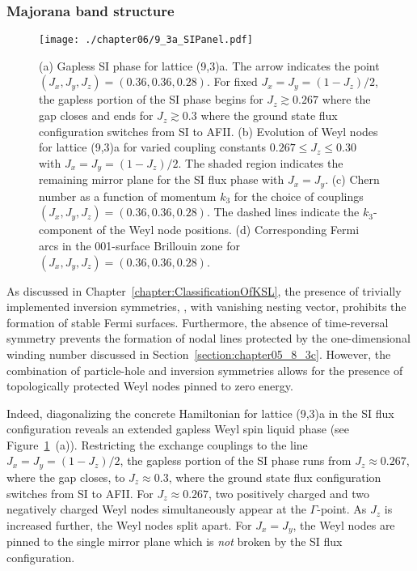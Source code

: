 \subsubsection{Majorana band structure}
%
%
%
\begin{figure}[tb]
	\centering
	\texttt{[image: ./chapter06/9\_3a\_SIPanel.pdf]}
	\caption{
		(a) Gapless SI phase for lattice (9,3)a.
		The arrow indicates the point $(J_x, J_y, J_z) = (0.36, 0.36, 0.28)$.
		For fixed $J_x = J_y = (1 - J_z)/2$, the gapless portion of the SI phase begins for $J_z \gtrsim 0.267$ where the gap closes and ends for $J_z \gtrsim 0.3$ where the ground state flux configuration switches from SI to AFII.
		(b) Evolution of Weyl nodes for lattice (9,3)a for varied coupling constants $0.267 \leq J_z \leq 0.30$ with $J_x = J_y = (1 - J_z)/2$.
		The shaded region indicates the remaining mirror plane for the SI flux phase with $J_x = J_y$.
		(c) Chern number as a function of momentum $k_3$ for the choice of couplings $(J_x, J_y, J_z) = (0.36, 0.36, 0.28)$.
		The dashed lines indicate the $k_3$-component of the Weyl node positions.
		(d) Corresponding Fermi arcs in the 001-surface Brillouin zone for $(J_x, J_y, J_z) = (0.36, 0.36, 0.28)$.
	}
	\label{fig:chapter06_SIPanel}
\end{figure}
%
As discussed in Chapter~\ref{chapter:ClassificationOfKSL}, the presence of trivially implemented inversion symmetries, \ie, with vanishing nesting vector, prohibits the formation of stable Fermi surfaces.
Furthermore, the absence of time-reversal symmetry prevents the formation of nodal lines protected by the one-dimensional winding number discussed in Section~\ref{section:chapter05_8_3c}.
However, the combination of particle-hole and inversion symmetries allows for the presence of topologically protected Weyl nodes pinned to zero energy.

Indeed, diagonalizing the concrete Hamiltonian for lattice (9,3)a in the SI flux configuration reveals an extended gapless Weyl spin liquid phase (see Figure~\ref{fig:chapter06_SIPanel}~(a)).
Restricting the exchange couplings to the line $J_x = J_y = (1 - J_z)/2$, the gapless portion of the SI phase runs from $J_z \approx 0.267$, where the gap closes, to $J_z \approx 0.3$, where the ground state flux configuration switches from SI to AFII.
For $J_z \approx 0.267$, two positively charged and two negatively charged Weyl nodes simultaneously appear at the $\Gamma$-point.
As $J_z$ is increased further, the Weyl nodes split apart.
For $J_x = J_y$, the Weyl nodes are pinned to the single mirror plane which is \textit{not} broken by the SI flux configuration.

